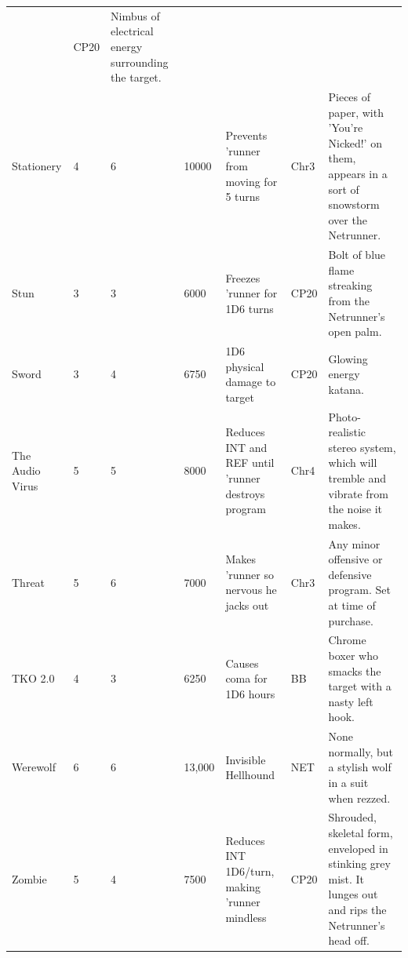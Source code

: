 \documentclass[11pt,twoside,a4paper]{article}
\begin{document}
\begin{landscape}
\begin{longtable}[ht]{ p{3.00cm} p{0.75cm} p{0.75cm} p{1.25cm} p{10.00cm} p{0.75cm} p{7.50cm} }
		&	CP20	&		Nimbus of electrical energy surrounding the target.	\\
	Stationery				&	4	&	6	&	10000	&	Prevents 'runner from moving for 5 turns	
		&	Chr3	&		Pieces of paper, with 'You're Nicked!' on them, appears in a sort of snowstorm over the Netrunner.	\\
	Stun					&	3	&	3	&	6000	&	Freezes 'runner for 1D6 turns	
		&	CP20	&		Bolt of blue flame streaking from the Netrunner's open palm.	\\
	Sword					&	3	&	4	&	6750	&	1D6 physical damage to target	
		&	CP20	&		Glowing energy katana.	\\
	The Audio Virus			&	5	&	5	&	8000	&	Reduces INT and REF until 'runner destroys program	
		&	Chr4	&		Photo-realistic stereo system, which will tremble and vibrate from the noise it makes.	\\
	Threat					&	5	&	6	&	7000	&	Makes 'runner so nervous he jacks out	
		&	Chr3	&		Any minor offensive or defensive program. Set at time of purchase.	\\
	TKO 2.0					&	4	&	3	&	6250	&	Causes coma for 1D6 hours	
		&	BB	&		Chrome boxer who smacks the target with a nasty left hook.	\\
	Werewolf				&	6	&	6	&	13,000	&	Invisible Hellhound	
		&	NET	&		None normally, but a stylish wolf in a suit when rezzed.	\\
	Zombie					&	5	&	4	&	7500	&	Reduces INT 1D6/turn, making 'runner mindless	
		&	CP20	&		Shrouded, skeletal form, enveloped in stinking grey mist. It lunges out and rips the Netrunner's head off.	\\



\end{longtable}
\end{landscape}
\end{document}
